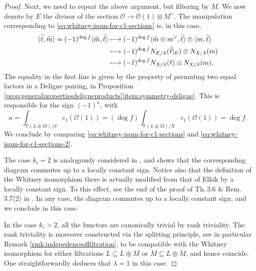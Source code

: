 \documentclass[JEP,XML,SOM,Unicode,published]{cedram}
\newcommand\mto{\mathchoice{\longmapsto}{\mapsto}{\mapsto}{\mapsto}}
\theoremstyle{plain}
\theoremstyle{definition}
\newcommand{\PBbb}{\mathbb P}
\newcommand{\Ocal}{\mathcal O}
\begin{document}
\begin{proof}
Next, we need to repeat the above argument, but filtering by $M$. We now denote by $E$ the divisor of the section $\Ocal\to \Ocal(1)\otimes M^{\vee}$. The manipulation corresponding to \eqref{eq:whitney-isom-for-c1-sections} is, in this case,
\begin{equation}\label{eq:whitney-isom-for-c1-sections-2}
\begin{split}
\langle\widetilde{\ell},\widetilde{m}\rangle=(-1)^{\deg f}\langle\widetilde{m},\widetilde{\ell}\rangle &\mto (-1)^{\deg f}\langle\widetilde{m}\otimes m^{\vee},\widetilde{\ell}\rangle\otimes \langle m,\widetilde{\ell}\rangle\\
&\mto (-1)^{\deg f}N_{E/S}(\widetilde{\ell}|_{E})\otimes N_{X/S}(m)\\
&\mto (-1)^{\deg f}N_{X/S}(\ell)\otimes N_{X/S}(m).
\end{split}
\end{equation}
The equality in the first line is given by the property of permuting two equal factors in a Deligne pairing, in Proposition \ref{prop:generalpropertiesdeligneproducts}\eqref{item:symmetry-deligne}. This is responsible for the sign $(-1)^{\kappa}$, with
\begin{displaymath}
\kappa=\int_{\PBbb(L\oplus M)/S}c_{1}(\Ocal(1))=(\deg f)\int_{\PBbb(L\oplus M)/X}c_{1}(\Ocal(1))=\deg f.
\end{displaymath}
We conclude by comparing \eqref{eq:whitney-isom-for-c1-sections} and \eqref{eq:whitney-isom-for-c1-sections-2}.

The case $k_i = 2 $ is analogously considered in \cite[Prop.\,3.9]{Eriksson-Freixas-Wentworth}, and shows that the corresponding diagram commutes up to a locally constant sign. Notice also that the definition of the Whitney isomorphism there is actually modified from that of Elkik by a locally constant sign. To this effect, see the end of the proof of Th.\,3.6 \& Rem.\,3.7(2) in \cite{Eriksson-Freixas-Wentworth}. In any case, the diagram commutes up to a locally constant sign, and we conclude in this case.

In the case $k_i > 2$, all the functors are canonically trivial by rank triviality. The rank triviality is moreover constructed via the splitting principle, see in particular Remark \ref{rmk:indepedenceoffiltration}, to be compatible with the Whitney isomorphism for either filtrations $L \subseteq L \oplus M$ or $M \subseteq L \oplus M$, and hence coincide. One straightforwardly deduces that $\lambda = 1$ in this case.
\end{proof}
\end{document}
